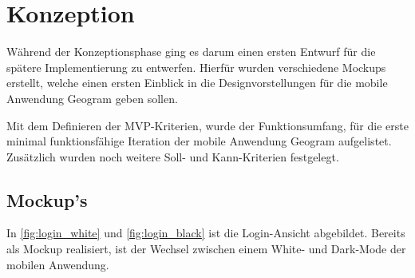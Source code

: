 \chapter{Konzeption\label{chap2:Zweites-Kapitel}}

Während der Konzeptionsphase ging es darum einen ersten Entwurf für die spätere Implementierung zu entwerfen. Hierfür wurden verschiedene Mockups erstellt, welche einen ersten Einblick in die Designvorstellungen für die mobile Anwendung \glqq Geogram\grqq{} geben sollen.

Mit dem Definieren der MVP-Kriterien, wurde der Funktionsumfang, für die erste minimal funktionsfähige Iteration der mobile Anwendung \glqq Geogram\grqq{} aufgelistet. Zusätzlich wurden noch weitere Soll- und Kann-Kriterien festgelegt.

\section{Mockup's\label{sec2.1:Unterpunkt-1}}

In \autoref{fig:login_white} und \autoref{fig:login_black} ist die Login-Ansicht abgebildet. Bereits als Mockup realisiert, ist der Wechsel zwischen einem White- und Dark-Mode der mobilen Anwendung.

